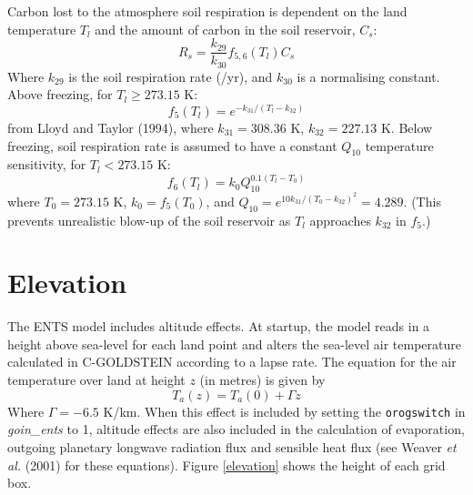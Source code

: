 \documentclass[10pt,a4paper]{report}
\begin{document}
Carbon lost to the atmosphere soil respiration is dependent on the
land temperature $T_l$ and the amount of carbon in the soil
reservoir, $C_s$:
\begin{equation}
R_s=\frac{k_{29}}{k_{30}} f_{5,6}(T_l) C_s
\end{equation}
Where $k_{29}$ is the soil respiration rate (/yr), and $k_{30}$ is
a normalising constant. Above freezing, for $T_l\geq 273.15$ K:
\begin{displaymath}
f_5(T_l)=e^{-k_{31}/(T_l-k_{32})}
\end{displaymath}
from Lloyd and Taylor (1994), where $k_{31}=308.36$ K,
$k_{32}=227.13$ K. Below freezing, soil respiration rate is
assumed to have a constant $Q_{10}$ temperature sensitivity, for
$T_l<273.15$ K:
\begin{displaymath}
f_6(T_l)=k_{0} Q_{10}^{0.1(T_l-T_{0})}
\end{displaymath}
where $T_{0}=273.15$ K, $k_{0}=f_5(T_{0})$, and $Q_{10}=e^{10
k_{31}/(T_{0}-k_{32})^2}=4.289$. (This prevents unrealistic
blow-up of the soil reservoir as $T_l$ approaches $k_{32}$ in
$f_5$.)


\section{Elevation}

The ENTS model includes altitude effects. At startup, the model
reads in a height above sea-level for each land point and alters the
sea-level air temperature calculated in C-GOLDSTEIN according to a
lapse rate. The equation for the air temperature over land at height
$z$ (in metres) is given by
\begin{equation}
T_{a}(z)=T_{a}(0)+\Gamma z
\end{equation}
Where $\Gamma=-6.5$ K/km. When this effect is included by setting
the {\tt orogswitch} in {\em goin\_ents} to 1, altitude effects are
also included in the calculation of evaporation, outgoing planetary
longwave radiation flux and sensible heat flux (see Weaver {\em et
al.} (2001) \cite{Uvic} for these equations). Figure \ref{elevation}
shows the height of each grid box.
\end{document}
